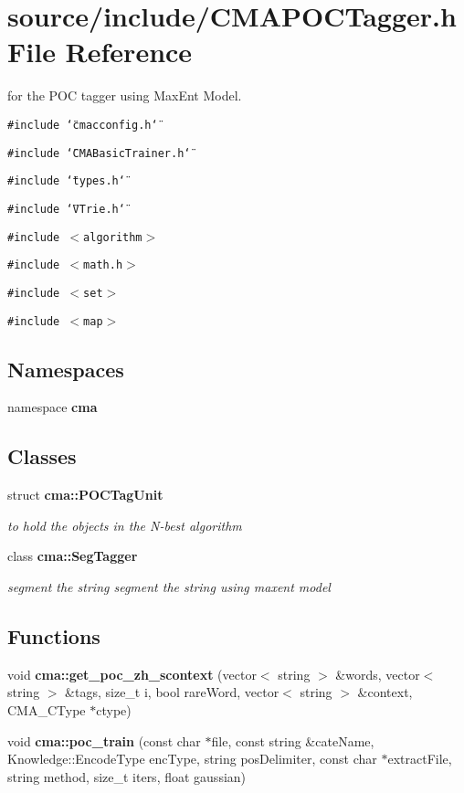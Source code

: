\section{source/include/CMAPOCTagger.h File Reference}
\label{CMAPOCTagger_8h}
for the POC tagger using MaxEnt Model. 

{\tt \#include \char`\"{}cmacconfig.h\char`\"{}}\par
{\tt \#include \char`\"{}CMABasicTrainer.h\char`\"{}}\par
{\tt \#include \char`\"{}types.h\char`\"{}}\par
{\tt \#include \char`\"{}VTrie.h\char`\"{}}\par
{\tt \#include $<$algorithm$>$}\par
{\tt \#include $<$math.h$>$}\par
{\tt \#include $<$set$>$}\par
{\tt \#include $<$map$>$}\par
\subsection*{Namespaces}
\begin{CompactItemize}
\item 
namespace \textbf{cma}
\end{CompactItemize}
\subsection*{Classes}
\begin{CompactItemize}
\item 
struct {\bf cma::POCTagUnit}
\begin{CompactList}\small\item\em to hold the objects in the N-best algorithm \item\end{CompactList}\item 
class {\bf cma::SegTagger}
\begin{CompactList}\small\item\em segment the string segment the string using maxent model \item\end{CompactList}\end{CompactItemize}
\subsection*{Functions}
\begin{CompactItemize}
\item 
void {\bf cma::get\_\-poc\_\-zh\_\-scontext} (vector$<$ string $>$ \&words, vector$<$ string $>$ \&tags, size\_\-t i, bool rareWord, vector$<$ string $>$ \&context, CMA\_\-CType $\ast$ctype)
\item 
void {\bf cma::poc\_\-train} (const char $\ast$file, const string \&cateName, Knowledge::EncodeType encType, string posDelimiter, const char $\ast$extractFile, string method, size\_\-t iters, float gaussian)
\end{CompactItemize}


